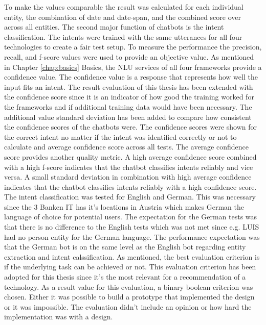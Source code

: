 To make the values comparable the result was calculated for each individual entity, 
the combination of date and date-span, 
and the combined score over across all entities.
The second major function of chatbots is the intent classification.
The intents were trained with the same utterances for all four technologies 
to create a fair test setup.
To measure the performance the precision, recall, and f-score values were used to 
provide an objective value.
As mentioned in Chapter \ref{chap:basics} Basics, the NLU services of all four 
frameworks provide a confidence value.
The confidence value is a response that represents how well the input fits an intent.
The result evaluation of this thesis has been extended with the confidence score since 
it is an indicator of how good the training worked for the frameworks and if 
additional training data would have been necessary.
The additional value standard deviation has been added to compare how consistent the 
confidence scores of the chatbots were. 
The confidence scores were shown for the correct intent no matter if the intent 
was identified correctly or not to calculate and average confidence 
score across all tests.
The average confidence score provides another quality metric.
A high average confidence score combined with a high f-score indicates that the 
chatbot classifies intents reliably and vice versa.
A small standard deviation in combination with high average confidence indicates
that the chatbot classifies intents reliably with a high confidence score. 
The intent classification was tested for English and German.
This was necessary since the 3 Banken IT has it's locations in Austria
which makes German the language of choice for potential users.
The expectation for the German tests was that there is no difference to the 
English tests which was not met since e.g. LUIS had no person entity for 
the German language.
The performance expectation was that the German bot is on the same level 
as the English bot regarding entity extraction and intent calssification.
As \citet{singhbuilding} mentioned, the best evaluation criterion is if the 
underlying task can be achieved or not.
This evaluation criterion has been adopted for this thesis since it's the 
most relevant for a recommendation of a technology.
As a result value for this evaluation, a binary boolean criterion was chosen.
Either it was possible to build a prototype that implemented the design or it was impossible.
The evaluation didn't include an opinion or how hard the implementation was with a design.
